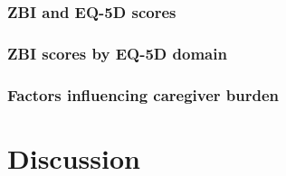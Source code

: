 \documentclass[12pt]{article}
\begin{document}
\subsubsection{ZBI and EQ-5D scores}

\subsubsection{ZBI scores by EQ-5D domain}

\subsubsection{Factors influencing caregiver burden}

\section{Discussion}

\clearpage
\newrefcontext[sorting=nyt]
\printbibliography
\end{document}
